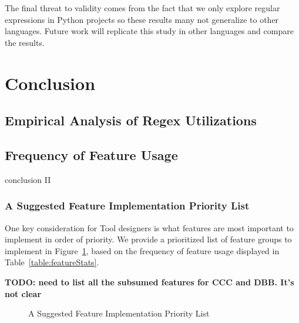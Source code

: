 \documentclass[conference]{IEEEtran}
\newcommand{\todo}[1]{\textbf{TODO: #1}}
\begin{document}
The final threat to validity comes from the fact that we only explore regular expressions in Python projects so these results many not generalize to other languages. Future work will replicate this study in other languages and compare the results.

\section{Conclusion}
\label{sec:conclusion}

\subsection{Empirical Analysis of Regex Utilizations}


\subsection{Frequency of Feature Usage}

conclusion II

\subsubsection{A Suggested Feature Implementation Priority List}

One key consideration for Tool designers is what features are most important to implement in order of priority.  We provide a prioritized list of feature groups to implement in Figure~\ref{suggestfeaturepriority}, based on the frequency of feature usage displayed in Table~\ref{table:featureStats}.

\todo{need to list all the subsumed features for CCC and DBB. It's not clear}

\begin{figure}[tb]
\caption{A Suggested Feature Implementation Priority List \label{suggestfeaturepriority}
}
\end{figure}
\end{document}
